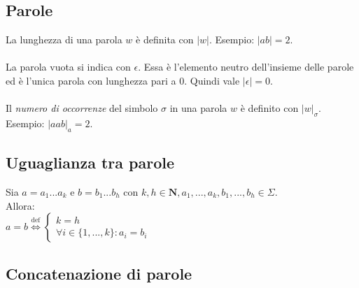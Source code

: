 \documentclass[]{article}
\begin{document}
\subsection{Parole}

La lunghezza di una parola \mbox{$w$} è definita con \mbox{$|w|$}. Esempio: \mbox{$|ab| = 2$}.
\\
\\
La parola vuota si indica con \mbox{$\epsilon$}. Essa è l'elemento neutro dell'insieme delle parole ed è l'unica
parola con lunghezza pari a \mbox{$0$}. Quindi vale \mbox{$|\epsilon|=0$}.
\\
\\
Il \textit{numero di occorrenze} del simbolo \mbox{$\sigma$} in una parola \mbox{$w$} è definito con \mbox{$|w|_\sigma$}. Esempio: \mbox{$|aab|_a=2$}.


\subsection{Uguaglianza tra parole}

Sia
\begin{math}
a = a_1...a_k
\end{math}
e
\begin{math}
b = b_1...b_h
\end{math}
con
\begin{math}
k, h \in \mathbf{N},
a_1, ..., a_k, b_1, ..., b_h \in \Sigma
\end{math}.
\\
Allora:
\\
\begin{math}
a=b
\overset{\text{def}}{\Leftrightarrow}
\begin{cases}
k = h \\
\forall i \in \{1, ..., k\} : a_i=b_i
\end{cases}
\end{math}

\newpage
\subsection{Concatenazione di parole}
\end{document}
